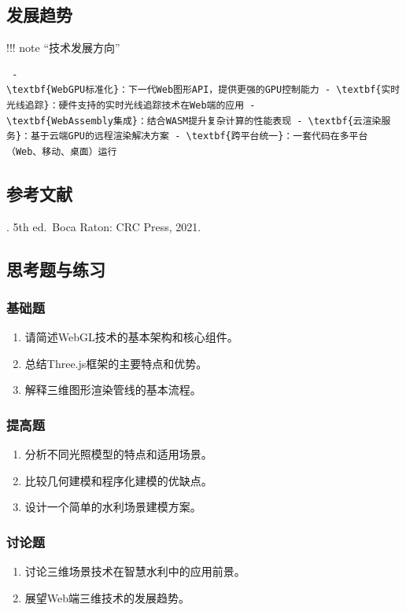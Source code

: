 {\subsection{发展趋势}\label{ux53d1ux5c55ux8d8bux52bf} !!! note ``技术发展方向'' \begin{verbatim} -
\textbf{WebGPU标准化}：下一代Web图形API，提供更强的GPU控制能力 - \textbf{实时光线追踪}：硬件支持的实时光线追踪技术在Web端的应用 -
\textbf{WebAssembly集成}：结合WASM提升复杂计算的性能表现 - \textbf{云渲染服务}：基于云端GPU的远程渲染解决方案 - \textbf{跨平台统一}：一套代码在多平台（Web、移动、桌面）运行
\end{verbatim} \subsection{参考文献}\label{ux53c2ux8003ux6587ux732e} . 5th ed.~Boca Raton: CRC Press, 2021.
\subsection{思考题与练习}\label{ux601dux8003ux9898ux4e0eux7ec3ux4e60} \subsubsection{基础题}\label{ux57faux7840ux9898}
\begin{enumerate} \def\labelenumi{\arabic{enumi}.} \tightlist \item 请简述WebGL技术的基本架构和核心组件。 \item 总结Three.js框架的主要特点和优势。
\item 解释三维图形渲染管线的基本流程。 \end{enumerate} \subsubsection{提高题}\label{ux63d0ux9ad8ux9898} \begin{enumerate}
\def\labelenumi{\arabic{enumi}.} \tightlist \item 分析不同光照模型的特点和适用场景。 \item 比较几何建模和程序化建模的优缺点。 \item 设计一个简单的水利场景建模方案。
\end{enumerate} \subsubsection{讨论题}\label{ux8ba8ux8bbaux9898} \begin{enumerate} \def\labelenumi{\arabic{enumi}.}
\tightlist \item 讨论三维场景技术在智慧水利中的应用前景。 \item 展望Web端三维技术的发展趋势。 \end{enumerate} \chaptersummary{
}}

